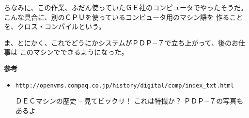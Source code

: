 \documentclass[12pt]{jarticle}
\begin{document}
ちなみに、この作業、ふだん使っていたＧＥ社のコンピュータでやったそうだ。
こんな具合に、別のＣＰＵを使っているコンピュータ用のマシン語を
作ることを、クロス・コンパイルという。

ま、とにかく、これでどうにかシステムがＰＤＰ−７で立ち上がって、後のお仕事は
このマシンでできるようになった。

\bigskip
\textbf{参考}
\begin{itemize}
\item \texttt{http://openvms.compaq.co.jp/history/digital/comp/index\_txt.html}

ＤＥＣマシンの歴史 -- 見てビックリ！ これは特撮か？ ＰＤＰ−７の写真もあるよ
\end{itemize}
\end{document}
